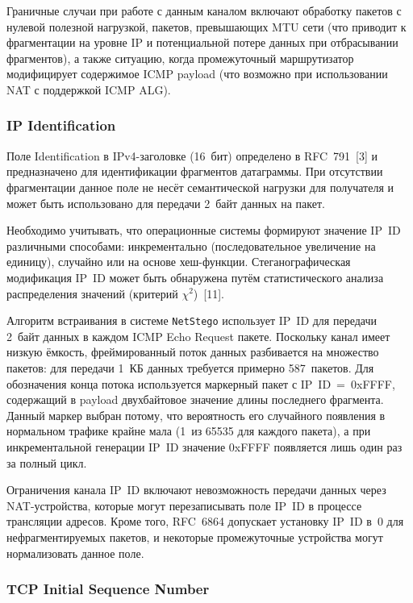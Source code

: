Граничные случаи при работе с данным каналом включают обработку пакетов с нулевой полезной нагрузкой, пакетов, превышающих MTU сети (что приводит к фрагментации на уровне IP и потенциальной потере данных при отбрасывании фрагментов), а также ситуацию, когда промежуточный маршрутизатор модифицирует содержимое ICMP payload (что возможно при использовании NAT с поддержкой ICMP ALG).

\subsubsection{IP Identification}

Поле Identification в IPv4-заголовке (16~бит) определено в RFC~791~[3] и предназначено для идентификации фрагментов датаграммы. При отсутствии фрагментации данное поле не несёт семантической нагрузки для получателя и может быть использовано для передачи 2~байт данных на пакет.

Необходимо учитывать, что операционные системы формируют значение IP~ID различными способами: инкрементально (последовательное увеличение на единицу), случайно или на основе хеш-функции. Стеганографическая модификация IP~ID может быть обнаружена путём статистического анализа распределения значений (критерий $\chi^2$)~[11].

Алгоритм встраивания в системе \texttt{NetStego} использует IP~ID для передачи 2~байт данных в каждом ICMP Echo Request пакете. Поскольку канал имеет низкую ёмкость, фреймированный поток данных разбивается на множество пакетов: для передачи 1~КБ данных требуется примерно 587~пакетов. Для обозначения конца потока используется маркерный пакет с IP~ID~=~0xFFFF, содержащий в payload двухбайтовое значение длины последнего фрагмента. Данный маркер выбран потому, что вероятность его случайного появления в нормальном трафике крайне мала (1~из 65535 для каждого пакета), а при инкрементальной генерации IP~ID значение 0xFFFF появляется лишь один раз за полный цикл.

Ограничения канала IP~ID включают невозможность передачи данных через NAT-устройства, которые могут перезаписывать поле IP~ID в процессе трансляции адресов. Кроме того, RFC~6864 допускает установку IP~ID в~0 для нефрагментируемых пакетов, и некоторые промежуточные устройства могут нормализовать данное поле.

\subsubsection{TCP Initial Sequence Number}

